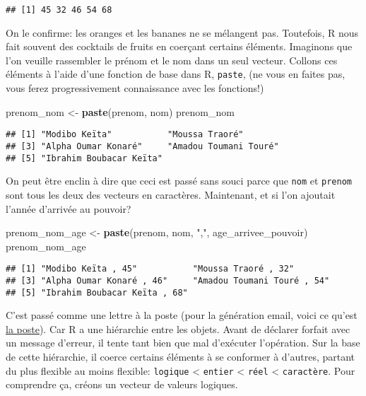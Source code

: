 \documentclass[]{book}
\newenvironment{Shaded}{\begin{snugshade}}{\end{snugshade}}
\newcommand{\KeywordTok}[1]{\textcolor[rgb]{0.13,0.29,0.53}{\textbf{#1}}}
\newcommand{\StringTok}[1]{\textcolor[rgb]{0.31,0.60,0.02}{#1}}
\newcommand{\NormalTok}[1]{#1}
\begin{document}
\begin{verbatim}
## [1] 45 32 46 54 68
\end{verbatim}

On le confirme: les oranges et les bananes ne se mélangent pas.
Toutefois, R nous fait souvent des cocktails de fruits en coerçant
certains éléments. Imaginons que l'on veuille rassembler le prénom et le
nom dans un seul vecteur. Collons ces éléments à l'aide d'une fonction
de base dans R, \texttt{paste}, (ne vous en faites pas, vous ferez
progressivement connaissance avec les fonctions!)

\begin{Shaded}
\begin{Highlighting}[]
\NormalTok{prenom_nom <-}\StringTok{ }\KeywordTok{paste}\NormalTok{(prenom, nom)}
\NormalTok{prenom_nom}
\end{Highlighting}
\end{Shaded}

\begin{verbatim}
## [1] "Modibo Keïta"           "Moussa Traoré"         
## [3] "Alpha Oumar Konaré"     "Amadou Toumani Touré"  
## [5] "Ibrahim Boubacar Keïta"
\end{verbatim}

On peut être enclin à dire que ceci est passé sans souci parce que
\texttt{nom} et \texttt{prenom} sont tous les deux des vecteurs en
caractères. Maintenant, et si l'on ajoutait l'année d'arrivée au
pouvoir?

\begin{Shaded}
\begin{Highlighting}[]
\NormalTok{prenom_nom_age <-}\StringTok{ }\KeywordTok{paste}\NormalTok{(prenom, nom, }\StringTok{","}\NormalTok{, age_arrivee_pouvoir)}
\NormalTok{prenom_nom_age}
\end{Highlighting}
\end{Shaded}

\begin{verbatim}
## [1] "Modibo Keïta , 45"           "Moussa Traoré , 32"         
## [3] "Alpha Oumar Konaré , 46"     "Amadou Toumani Touré , 54"  
## [5] "Ibrahim Boubacar Keïta , 68"
\end{verbatim}

C'est passé comme une lettre à la poste (pour la génération email, voici
ce qu'est \href{https://fr.wikipedia.org/wiki/Poste}{la poste}). Car R a
une hiérarchie entre les objets. Avant de déclarer forfait avec un
message d'erreur, il tente tant bien que mal d'exécuter l'opération. Sur
la base de cette hiérarchie, il coerce certains éléments à se conformer
à d'autres, partant du plus flexible au moins flexible: \texttt{logique}
\textless{} \texttt{entier} \textless{} \texttt{réel} \textless{}
\texttt{caractère}. Pour comprendre ça, créons un vecteur de valeurs
logiques.
\end{document}
